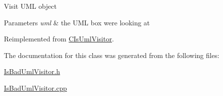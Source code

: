 Visit U\+ML object 
\begin{DoxyParams}{Parameters}
{\em uml} & the U\+ML box we\textquotesingle{}re looking at \\
\hline
\end{DoxyParams}


Reimplemented from \mbox{\hyperlink{class_c_is_uml_visitor_ac49fb3a73f9949c21faf54d92d366b7c}{C\+Is\+Uml\+Visitor}}.



The documentation for this class was generated from the following files\+:\begin{DoxyCompactItemize}
\item 
\mbox{\hyperlink{_is_bad_uml_visitor_8h}{Is\+Bad\+Uml\+Visitor.\+h}}\item 
\mbox{\hyperlink{_is_bad_uml_visitor_8cpp}{Is\+Bad\+Uml\+Visitor.\+cpp}}\end{DoxyCompactItemize}
